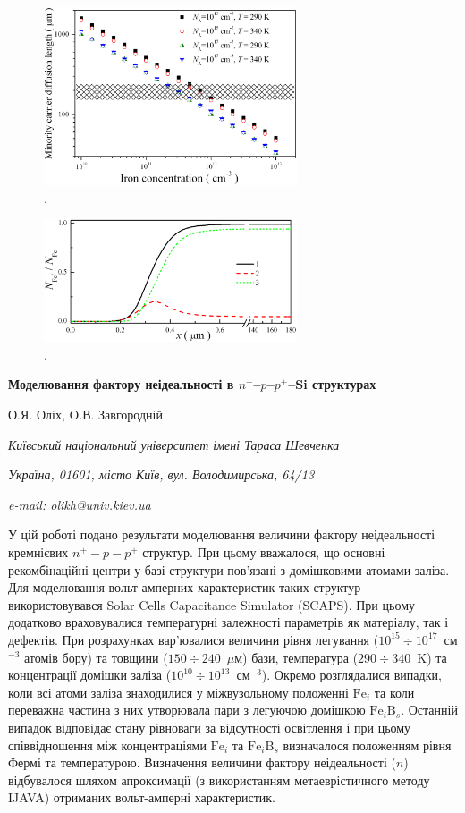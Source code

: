 \documentclass[12pt]{article}
\begin{document}
\begin{figure}
\includegraphics[width=7.5cm]{FigLn}
\caption{.
}
\label{FigLn}
\end{figure}

\begin{figure}
\includegraphics[width=7.5cm]{FigDelFei}
\caption{.
}
\label{FigDelFei}
\end{figure}

\newpage

\begin{center}
{\bfseries Моделювання фактору неідеальності в $n^+$--$p$--$p^+$--Si структурах}

О.Я. Оліх, O.В. Завгородній

\emph{Київський національний університет імені Тараса Шевченка}

\emph{Україна, 01601, місто Київ, вул. Володимирська, 64/13}

\emph{e-mail: olikh@univ.kiev.ua}

\end{center}

У цій роботі подано результати моделювання величини фактору неідеальності кремнієвих $n^+-p-p^+$ структур.
При цьому вважалося, що основні рекомбінаційні центри у базі структури пов'язані з домішковими атомами заліза.
Для моделювання вольт-амперних характеристик таких структур використовувався Solar Cells Capacitance Simulator (SCAPS).
При цьому додатково враховувалися температурні залежності параметрів як матеріалу, так і дефектів.
При розрахунках вар'ювалися величини рівня легування ($10^{15}\div10^{17}$~см$^{-3}$ атомів бору) та товщини ($150\div240$~$\mu$м) бази,
температура ($290\div340$~K) та концентрації домішки заліза ($10^{10}\div10^{13}$~см$^{-3}$).
Окремо розглядалися випадки, коли всі атоми заліза знаходилися у міжвузольному положенні $\mathrm{Fe}_i$ та
коли переважна частина з них утворювала пари з легуючою домішкою $\mathrm{Fe}_i\mathrm{B}_s$.
Останній випадок відповідає стану рівноваги за відсутності освітлення і при цьому
співвідношення між концентраціями  $\mathrm{Fe}_i$ та $\mathrm{Fe}_i\mathrm{B}_s$ визначалося положенням
рівня Фермі та температурою.
Визначення величини фактору неідеальності ($n$) відбувалося шляхом апроксимації (з використанням
метаеврістичного методу IJAVA) отриманих вольт-амперні характеристик.
\end{document}
